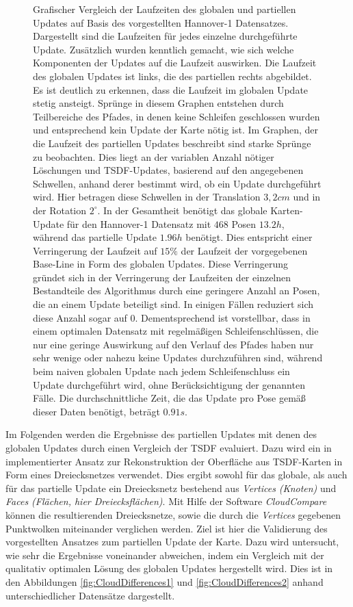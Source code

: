 \begin{figure}
	\caption{Grafischer Vergleich der Laufzeiten des globalen und partiellen Updates auf Basis des vorgestellten Hannover-1 Datensatzes. Dargestellt sind die Laufzeiten für jedes einzelne durchgeführte Update. Zusätzlich wurden kenntlich gemacht, wie sich welche Komponenten der Updates auf die Laufzeit auswirken. Die Laufzeit des globalen Updates ist links, die des partiellen rechts abgebildet. Es ist deutlich zu erkennen, dass die Laufzeit im globalen Update stetig ansteigt. Sprünge in diesem Graphen entstehen durch Teilbereiche des Pfades, in denen keine Schleifen geschlossen wurden und entsprechend kein Update der Karte nötig ist. Im Graphen, der die Laufzeit des partiellen Updates beschreibt sind starke Sprünge zu beobachten. Dies liegt an der variablen Anzahl nötiger Löschungen und TSDF-Updates, basierend auf den angegebenen Schwellen, anhand derer bestimmt wird, ob ein Update durchgeführt wird. Hier betragen diese Schwellen in der Translation $3,2 cm$ und in der Rotation $2^\circ$. In der Gesamtheit benötigt das globale Karten-Update für den Hannover-1 Datensatz mit $468$ Posen $13.2h$, während das partielle Update $1.96h$ benötigt. Dies entspricht einer Verringerung der Laufzeit auf $15\%$ der Laufzeit der vorgegebenen Base-Line in Form des globalen Updates. Diese Verringerung gründet sich in der Verringerung der Laufzeiten der einzelnen Bestandteile des Algorithmus durch eine geringere Anzahl an Posen, die an einem Update beteiligt sind. In einigen Fällen reduziert sich diese Anzahl sogar auf $0$. Dementsprechend ist vorstellbar, dass in einem optimalen Datensatz mit regelmäßigen Schleifenschlüssen, die nur eine geringe Auswirkung auf den Verlauf des Pfades haben nur sehr wenige oder nahezu keine Updates durchzuführen sind, während beim naiven globalen Update nach jedem Schleifenschluss ein Update durchgeführt wird, ohne Berücksichtigung der genannten Fälle. Die durchschnittliche Zeit, die das Update pro Pose gemäß dieser Daten benötigt, beträgt $0.91s$.}
	\label{fig:MapUpdateTimes}
\end{figure}
	
Im Folgenden werden die Ergebnisse des partiellen Updates mit denen des globalen Updates durch einen Vergleich der TSDF evaluiert. Dazu wird ein in \cite{HATSDF} implementierter Ansatz zur Rekonstruktion der Oberfläche aus TSDF-Karten in Form eines Dreiecksnetzes verwendet. Dies ergibt sowohl für das globale, als auch für das partielle Update ein Dreiecksnetz bestehend aus \emph{Vertices (Knoten)} und \emph{Faces (Flächen, hier Dreiecksflächen)}. Mit Hilfe der Software \emph{CloudCompare} \cite{cloudcompare} können die resultierenden Dreiecksnetze, sowie die durch die \emph{Vertices} gegebenen Punktwolken miteinander verglichen werden. Ziel ist hier die Validierung des vorgestellten Ansatzes zum partiellen Update der Karte. Dazu wird untersucht, wie sehr die Ergebnisse voneinander abweichen, indem ein Vergleich mit der qualitativ optimalen Lösung des globalen Updates hergestellt wird. Dies ist in den Abbildungen \ref{fig:CloudDifferences1} und \ref{fig:CloudDifferences2} anhand unterschiedlicher Datensätze dargestellt.

